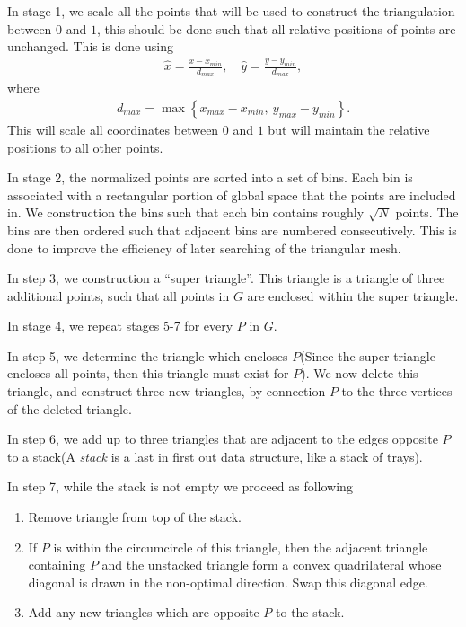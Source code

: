 \documentclass[../fem.tex]{subfile}
\begin{document}
In stage 1, we scale all the points that will be used to construct the
triangulation between $0$ and $1$, this should be done such that all relative
positions of points are unchanged. This is done using
\begin{align*}
  \hat{x}=\frac{x-x_{min}}{d_{max}},\quad\hat{y}=\frac{y-y_{min}}{d_{max}},
\end{align*}
where
\begin{align*}
  d_{max}=\max\left\{x_{max}-x_{min},\ y_{max}-y_{min}\right\}.
\end{align*}
This will scale all coordinates between $0$ and $1$ but will maintain the
relative positions to all other points.

In stage 2, the normalized points are sorted into a set of bins. Each bin is
associated with a rectangular portion of global space that the points are
included in. We construction the bins such that each bin contains roughly
$\sqrt{N}$ points. The bins are then ordered such that adjacent bins are
numbered consecutively. This is done to improve the efficiency of later
searching of the triangular mesh.

In step 3, we construction a ``super triangle''. This triangle is a triangle of
three additional points, such that all points in $G$ are enclosed within the
super triangle.

In stage 4, we repeat stages 5-7 for every $P$ in $G$.

In step 5, we determine the triangle which encloses $P$(Since the super
triangle encloses all points, then this triangle must exist for $P$). We now
delete this triangle, and construct three new triangles, by connection $P$ to
the three vertices of the deleted triangle.

In step 6, we add up to three triangles that are adjacent to the edges opposite
$P$ to a stack(A \textit{stack} is a last in first out data structure, like a
stack of trays).

In step 7, while the stack is not empty we proceed as following

\begin{enumerate}[label=7.\arabic*.]
  \item Remove triangle from top of the stack.
  \item If $P$ is within the circumcircle of this triangle, then the adjacent
    triangle containing $P$ and the unstacked triangle form a convex
    quadrilateral whose diagonal is drawn in the non-optimal direction. Swap
    this diagonal edge.
  \item Add any new triangles which are opposite $P$ to the stack.
\end{enumerate}
\end{document}
